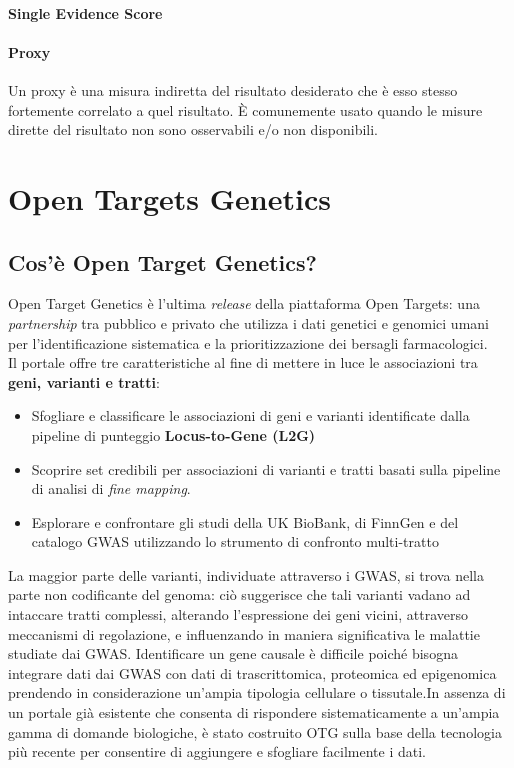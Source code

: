 \documentclass{article}
\begin{document}
\paragraph{Single Evidence Score}
\paragraph{Proxy}Un proxy è una misura indiretta del risultato desiderato che è esso stesso fortemente correlato a quel risultato. È comunemente usato quando le misure dirette del risultato non sono osservabili e/o non disponibili.

\section{Open Targets Genetics}
\subsection{Cos'è Open Target Genetics?}
Open Target Genetics è l'ultima \textit{release} della piattaforma Open Targets: una \textit{partnership} tra pubblico e privato che utilizza i dati genetici e genomici umani per l'identificazione sistematica e la prioritizzazione dei bersagli farmacologici.\\
Il portale offre tre caratteristiche al fine di mettere in luce le associazioni tra \textbf{geni, varianti e tratti}:
\begin{itemize}
    \item Sfogliare e classificare le associazioni di geni e varianti identificate dalla pipeline di punteggio \textbf{Locus-to-Gene (L2G)}
    \item Scoprire set credibili per associazioni di varianti e tratti basati sulla pipeline di analisi di \textit{fine mapping}.
    \item Esplorare e confrontare gli studi della UK BioBank, di FinnGen e del catalogo GWAS utilizzando lo strumento di confronto multi-tratto
\end{itemize} 

\begin{box3}
    [title={\textbf{La novità di OTG}}]
    {La maggior parte delle varianti, individuate attraverso i GWAS, si trova nella parte non codificante del genoma: ciò suggerisce che tali varianti vadano ad intaccare tratti complessi, alterando l'espressione dei geni vicini, attraverso meccanismi di regolazione, e influenzando in maniera significativa le malattie studiate dai GWAS. 
    Identificare un gene causale è difficile poiché bisogna integrare dati dai GWAS con dati di trascrittomica, proteomica ed epigenomica prendendo in considerazione un'ampia tipologia cellulare o tissutale.In assenza di un portale già esistente che consenta di rispondere sistematicamente a un'ampia gamma di domande biologiche, è stato costruito OTG sulla base della tecnologia più recente per consentire di aggiungere e sfogliare facilmente i dati.}
\end{box3}
\end{document}
